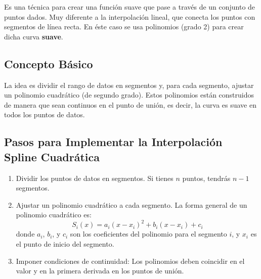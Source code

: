 Es una técnica para crear una función suave que pase a través de un conjunto 
  de puntos dados. Muy diferente a la interpolación lineal, que conecta los puntos 
  con segmentos de línea recta. En éste caso se usa polinomios (grado 2) para crear
  dicha curva \textbf{suave}.\par
    \subsection{Concepto Básico}
    La idea es dividir el rango de datos en segmentos y, para cada segmento, ajustar 
    un polinomio cuadrático (de segundo grado). Estos polinomios están construidos de 
    manera que sean continuos en el punto de unión, es decir, la curva es suave en todos 
    los puntos de datos.
    \subsection{Pasos para Implementar la Interpolación Spline Cuadrática}
     \begin{enumerate}
        \item Dividir los puntos de datos en segmentos. Si tienes $n$ puntos, tendrás $n-1$ segmentos.
        \item Ajustar un polinomio cuadrático a cada segmento. La forma general de un polinomio cuadrático es:
        \[S_i(x) = a_i (x - x_i)^2 + b_i (x - x_i) + c_i\]
        donde $a_i$, $b_i$, y $c_i$ son los coeficientes del polinomio para el segmento $i$, y $x_i$ es el punto 
        de inicio del segmento.
        \item Imponer condiciones de continuidad: Los polinomios deben coincidir en el valor y en la primera 
        derivada en los puntos de unión.
      \end{enumerate}